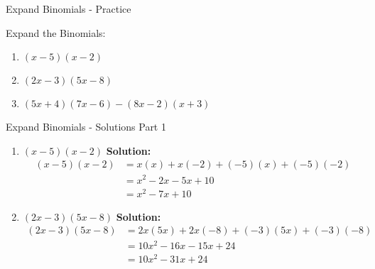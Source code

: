 \documentclass[aspectratio=169]{beamer}
\begin{document}
\begin{frame}{Expand Binomials - Practice}
    \begin{tcolorbox}[colback=lightgray,colframe=primary,title=Practice Problems]
        \footnotesize
        Expand the Binomials:
        \begin{enumerate}
            \setlength{\itemsep}{0.5em}
            \item $(x - 5)(x - 2)$
            \item $(2x - 3)(5x - 8)$
            \item $(5x + 4)(7x - 6) - (8x - 2)(x + 3)$
        \end{enumerate}
    \end{tcolorbox}
\end{frame}

\begin{frame}{Expand Binomials - Solutions Part 1}
    \begin{tcolorbox}[colback=lightgray,colframe=accent,title=Detailed Solutions]
        \footnotesize
        \begin{enumerate}
            \setlength{\itemsep}{0.5em}
            \item $(x - 5)(x - 2)$
            \quad \textbf{Solution:}
            \begin{align*}
                (x - 5)(x - 2) &= x(x) + x(-2) + (-5)(x) + (-5)(-2) \\
                &= x^2 - 2x - 5x + 10 \\
                &= x^2 - 7x + 10
            \end{align*}
            \item $(2x - 3)(5x - 8)$
            \quad \textbf{Solution:}
            \begin{align*}
                (2x - 3)(5x - 8) &= 2x(5x) + 2x(-8) + (-3)(5x) + (-3)(-8) \\
                &= 10x^2 - 16x - 15x + 24 \\
                &= 10x^2 - 31x + 24
            \end{align*}
        \end{enumerate}
    \end{tcolorbox}
\end{frame}
\end{document}
